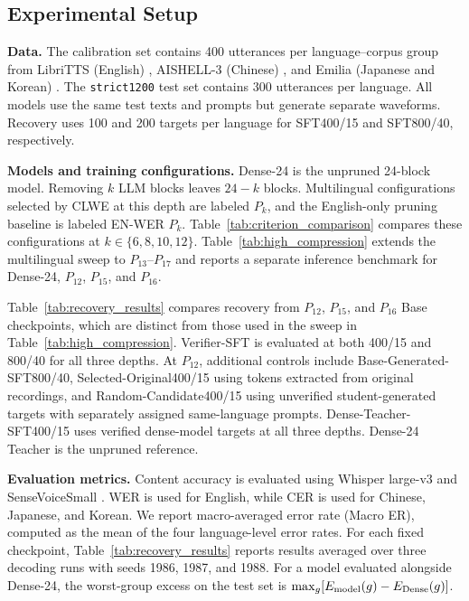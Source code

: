 \documentclass{article}
\begin{document}
\subsection{Experimental Setup}
\label{sec:setup}

\noindent\textbf{Data.}
The calibration set contains 400 utterances per language--corpus group from LibriTTS
(English) \cite{zen2019libritts}, AISHELL-3 (Chinese)
\cite{shi2021aishell3}, and Emilia (Japanese and Korean)
\cite{he2025emilia}. The \texttt{strict1200} test set contains 300
utterances per language. All models use the same test texts and prompts
but generate separate waveforms. Recovery uses 100 and 200 targets per
language for SFT400/15 and SFT800/40, respectively.

\noindent\textbf{Models and training configurations.}
Dense-24 is the unpruned 24-block model. Removing \(k\) LLM blocks
leaves \(24-k\) blocks. Multilingual configurations selected by CLWE
at this depth are labeled \(P_k\), and the English-only pruning
baseline is labeled EN-WER \(P_k\).
Table~\ref{tab:criterion_comparison} compares these configurations at
\(k\in\{6,8,10,12\}\). Table~\ref{tab:high_compression} extends the
multilingual sweep to \(P_{13}\)--\(P_{17}\) and reports a separate
inference benchmark for Dense-24, \(P_{12}\), \(P_{15}\), and \(P_{16}\).

Table~\ref{tab:recovery_results} compares recovery from \(P_{12}\),
\(P_{15}\), and \(P_{16}\) Base checkpoints, which are distinct from
those used in the sweep in Table~\ref{tab:high_compression}. Verifier-SFT
is evaluated at both 400/15 and 800/40 for all three depths. At
\(P_{12}\), additional controls include Base-Generated-SFT800/40,
Selected-Original400/15 using tokens extracted from original recordings, and
Random-Candidate400/15 using unverified student-generated targets with
separately assigned same-language prompts. Dense-Teacher-SFT400/15
uses verified dense-model targets at all three depths. Dense-24
Teacher is the unpruned reference.

\noindent\textbf{Evaluation metrics.}
Content accuracy is evaluated using Whisper large-v3
\cite{radford2023whisper} and SenseVoiceSmall
\cite{an2024funaudiollm}. WER is used for English, while CER is used for Chinese,
Japanese, and Korean. We report macro-averaged error rate (Macro ER),
computed as the mean of the four language-level error rates.
For each fixed checkpoint, Table~\ref{tab:recovery_results} reports
results averaged over three decoding runs with seeds 1986, 1987, and
1988. For a model evaluated alongside Dense-24, the worst-group excess
on the test set is
$\max_g[E_{\rm model}(g)-E_{\rm Dense}(g)]$.
\end{document}
